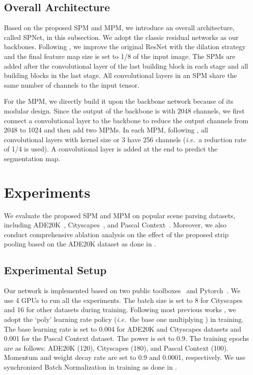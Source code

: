 \documentclass[final]{cvpr}
\def\ie{\emph{i.e.~}}
\begin{document}
\subsection{Overall Architecture} \label{sec:architecture}

Based on the proposed SPM and MPM, we introduce
an overall architecture, called SPNet,
in this subsection.
We adopt the classic residual networks \cite{He2016} as our backbones.
Following \cite{chen2017deeplab,zhao2016pyramid,fu2019dual}, we improve the original ResNet 
with the dilation strategy and the final feature map size is set to 1/8 of the input image.
The SPMs are added after the  convolutional layer of the last building block in each stage and all building blocks in the last stage.
All convolutional layers in an SPM share the same number of channels to the input tensor.


For the MPM, we directly build it upon the
backbone network because of its modular design.
Since the output of the backbone is with 2048 channels, we first connect a  convolutional layer to the backbone to reduce the output channels from 2048 to 1024 and then add two MPMs.
In each MPM, following \cite{He2016}, all 
convolutional layers with kernel size  or 
3 have 256 channels (\ie a reduction rate of 1/4
is used).
A convolutional layer is added at the end to predict 
the segmentation map.



\section{Experiments} \label{sec:experiments}

We evaluate the proposed SPM and MPM 
on popular scene parsing datasets, including 
ADE20K~\cite{zhou2017scene},
Cityscapes~\cite{cordts2016cityscapes}, 
and Pascal Context~\cite{mottaghi2014role}. 
Moreover, we also conduct comprehensive ablation analysis on the effect of the proposed strip pooling based on the ADE20K dataset as done in \cite{zhao2016pyramid}.


\subsection{Experimental Setup}

Our network is implemented based on two public toolboxes~\cite{semseg2019,encoding2018} 
and Pytorch~\cite{paszke2019pytorch}.
We use 4 GPUs to run all the experiments.
The batch size is set to 8 for Cityscapes and 16 
for other datasets during training.
Following most previous works \cite{chen2017deeplab,zhao2016pyramid,zhang2018context},
we adopt the `poly' learning rate policy (\ie the base one multiplying ) in training.
The base learning rate is set to 0.004 for ADE20K and
Cityscapes datasets and 0.001 for the Pascal Context dataset.
The power is set to 0.9.
The training epochs are as follows: ADE20K (120), 
Cityscapes (180), and Pascal Context (100). 
Momentum and weight decay rate are set to 0.9 
and 0.0001, respectively.
We use synchronized Batch Normalization in training
as done in \cite{zhang2018context,zhao2016pyramid}.
\end{document}

